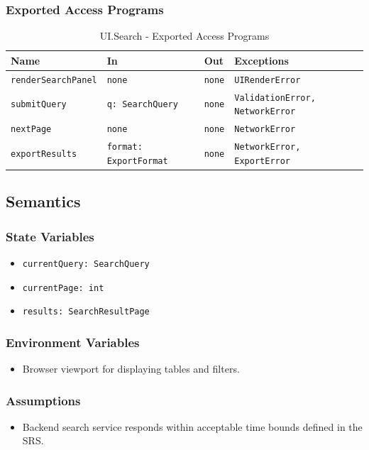 \documentclass[12pt, titlepage]{article}
\begin{document}
\subsubsection{Exported Access Programs}

\begin{table}[H]
\centering
\small
\caption{UI.Search - Exported Access Programs}
\begin{tabular}{p{3.5cm} p{3.2cm} p{3.2cm} p{4.1cm}}
\toprule
\textbf{Name} & \textbf{In} & \textbf{Out} & \textbf{Exceptions} \\
\midrule
\texttt{renderSearchPanel} & \texttt{none} & \texttt{none} & \texttt{UIRenderError} \\
\texttt{submitQuery} & \texttt{q: SearchQuery} & \texttt{none} & \texttt{ValidationError, NetworkError} \\
\texttt{nextPage} & \texttt{none} & \texttt{none} & \texttt{NetworkError} \\
\texttt{exportResults} & \texttt{format: ExportFormat} & \texttt{none} & \texttt{NetworkError, ExportError} \\
\bottomrule
\end{tabular}
\end{table}

\subsection{Semantics}

\subsubsection{State Variables}
\begin{itemize}
    \item \texttt{currentQuery: SearchQuery}
    \item \texttt{currentPage: int}
    \item \texttt{results: SearchResultPage}
\end{itemize}

\subsubsection{Environment Variables}
\begin{itemize}
    \item Browser viewport for displaying tables and filters.
\end{itemize}

\subsubsection{Assumptions}
\begin{itemize}
    \item Backend search service responds within acceptable time bounds defined in the SRS.
\end{itemize}
\end{document}
